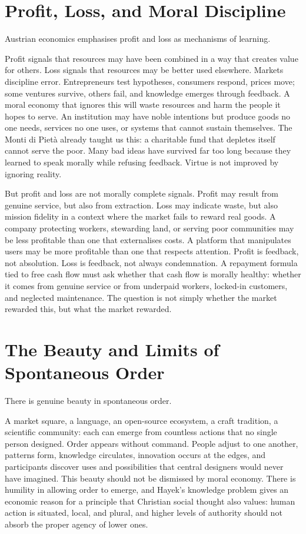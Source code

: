 \documentclass[11pt,a4paper,oneside]{book}
\begin{document}
\section*{Profit, Loss, and Moral Discipline}

Austrian economics emphasises profit and loss as mechanisms of learning.

Profit signals that resources may have been combined in a way that creates value for others. Loss signals that resources may be better used elsewhere. Markets discipline error. Entrepreneurs test hypotheses, consumers respond, prices move; some ventures survive, others fail, and knowledge emerges through feedback. A moral economy that ignores this will waste resources and harm the people it hopes to serve. An institution may have noble intentions but produce goods no one needs, services no one uses, or systems that cannot sustain themselves. The Monti di Pietà already taught us this: a charitable fund that depletes itself cannot serve the poor. Many bad ideas have survived far too long because they learned to speak morally while refusing feedback. Virtue is not improved by ignoring reality.

But profit and loss are not morally complete signals. Profit may result from genuine service, but also from extraction. Loss may indicate waste, but also mission fidelity in a context where the market fails to reward real goods. A company protecting workers, stewarding land, or serving poor communities may be less profitable than one that externalises costs. A platform that manipulates users may be more profitable than one that respects attention. Profit is feedback, not absolution. Loss is feedback, not always condemnation. A repayment formula tied to free cash flow must ask whether that cash flow is morally healthy: whether it comes from genuine service or from underpaid workers, locked-in customers, and neglected maintenance. The question is not simply whether the market rewarded this, but what the market rewarded.

\section*{The Beauty and Limits of Spontaneous Order}

There is genuine beauty in spontaneous order.

A market square, a language, an open-source ecosystem, a craft tradition, a scientific community: each can emerge from countless actions that no single person designed. Order appears without command. People adjust to one another, patterns form, knowledge circulates, innovation occurs at the edges, and participants discover uses and possibilities that central designers would never have imagined. This beauty should not be dismissed by moral economy. There is humility in allowing order to emerge, and Hayek's knowledge problem gives an economic reason for a principle that Christian social thought also values: human action is situated, local, and plural, and higher levels of authority should not absorb the proper agency of lower ones.
\end{document}

